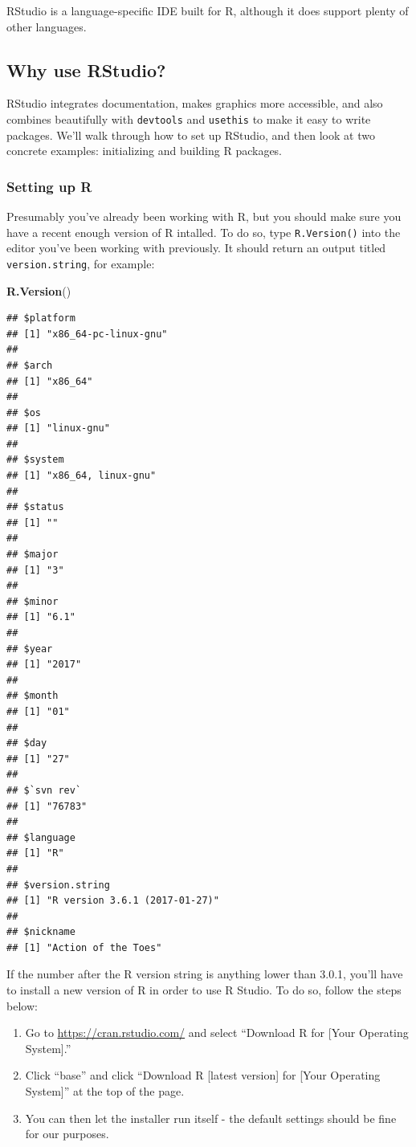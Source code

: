 \documentclass[]{book}
\newenvironment{Shaded}{\begin{snugshade}}{\end{snugshade}}
\newcommand{\KeywordTok}[1]{\textcolor[rgb]{0.13,0.29,0.53}{\textbf{#1}}}
\newcommand{\NormalTok}[1]{#1}
\begin{document}
RStudio is a language-specific IDE built for R, although it does support
plenty of other languages.

\subsection{Why use RStudio?}\label{why-use-rstudio}

RStudio integrates documentation, makes graphics more accessible, and
also combines beautifully with \texttt{devtools} and \texttt{usethis} to
make it easy to write packages. We'll walk through how to set up
RStudio, and then look at two concrete examples: initializing and
building R packages.

\subsubsection{Setting up R}\label{setting-up-r}

Presumably you've already been working with R, but you should make sure
you have a recent enough version of R intalled. To do so, type
\texttt{R.Version()} into the editor you've been working with
previously. It should return an output titled \texttt{version.string},
for example:

\begin{Shaded}
\begin{Highlighting}[]
\KeywordTok{R.Version}\NormalTok{()}
\end{Highlighting}
\end{Shaded}

\begin{verbatim}
## $platform
## [1] "x86_64-pc-linux-gnu"
## 
## $arch
## [1] "x86_64"
## 
## $os
## [1] "linux-gnu"
## 
## $system
## [1] "x86_64, linux-gnu"
## 
## $status
## [1] ""
## 
## $major
## [1] "3"
## 
## $minor
## [1] "6.1"
## 
## $year
## [1] "2017"
## 
## $month
## [1] "01"
## 
## $day
## [1] "27"
## 
## $`svn rev`
## [1] "76783"
## 
## $language
## [1] "R"
## 
## $version.string
## [1] "R version 3.6.1 (2017-01-27)"
## 
## $nickname
## [1] "Action of the Toes"
\end{verbatim}

If the number after the R version string is anything lower than 3.0.1,
you'll have to install a new version of R in order to use R Studio. To
do so, follow the steps below:

\begin{enumerate}
\def\labelenumi{\arabic{enumi}.}
\item
  Go to \url{https://cran.rstudio.com/} and select ``Download R for
  {[}Your Operating System{]}.''
\item
  Click ``base'' and click ``Download R {[}latest version{]} for {[}Your
  Operating System{]}'' at the top of the page.
\item
  You can then let the installer run itself - the default settings
  should be fine for our purposes.
\end{enumerate}
\end{document}
